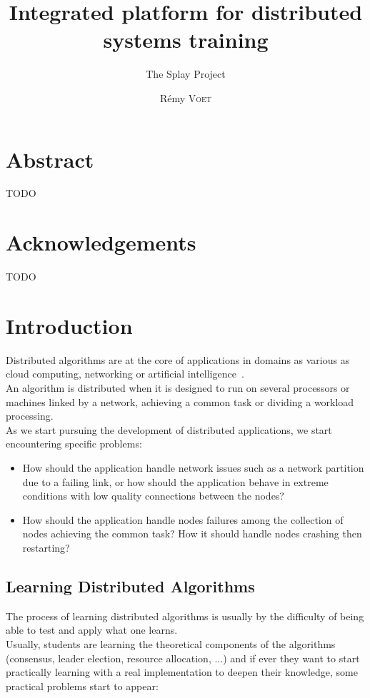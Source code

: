 \documentclass{eplmastersthesis}
\title{Integrated platform for distributed systems training}
\subtitle{The Splay Project}
\author{Rémy \textsc{Voet}}
\begin{document}
  \maketitle

  \chapter*{Abstract}
  {\color{red} TODO}

  \chapter*{Acknowledgements}
  {\color{red} TODO}

  \tableofcontents

  \chapter{Introduction}

    Distributed algorithms are at the core of applications in domains as
    various as cloud computing, networking or artificial
    intelligence~\cite{DistributedArtificialIntelligence}.\\
    An algorithm is distributed when it is designed to run on several
    processors or machines linked by a network, achieving a common task
    or dividing a workload processing.\\

    As we start pursuing the development of distributed applications,
    we start encountering specific problems:
    \begin{itemize}
      \item How should the application handle network issues such as
      a network partition due to a failing link, or how should the application
      behave in extreme conditions with low quality connections between
      the nodes?
      \item How should the application handle nodes failures among the
      collection of nodes achieving the common task? How it should handle
      nodes crashing then restarting?
    \end{itemize}

    \section{Learning Distributed Algorithms}

      The process of learning distributed algorithms is usually by the
      difficulty of being able to test and apply what one learns.\\
      Usually, students are learning the theoretical components of the
      algorithms (consensus, leader election, resource allocation, ...)
      and if ever they want to start practically learning with a real
      implementation to deepen their knowledge, some practical problems
      start to appear:
\end{document}
